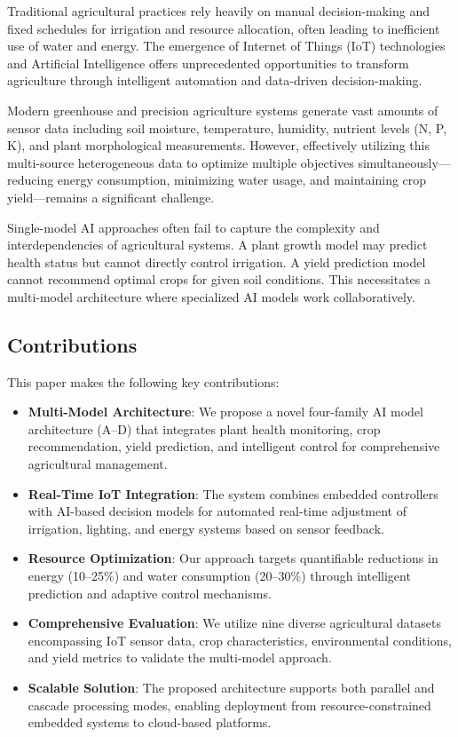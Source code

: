 \documentclass[conference]{IEEEtran}
\begin{document}
Traditional agricultural practices rely heavily on manual decision-making and fixed schedules for irrigation and resource allocation, often leading to inefficient use of water and energy. The emergence of Internet of Things (IoT) technologies and Artificial Intelligence offers unprecedented opportunities to transform agriculture through intelligent automation and data-driven decision-making.

Modern greenhouse and precision agriculture systems generate vast amounts of sensor data including soil moisture, temperature, humidity, nutrient levels (N, P, K), and plant morphological measurements. However, effectively utilizing this multi-source heterogeneous data to optimize multiple objectives simultaneously—reducing energy consumption, minimizing water usage, and maintaining crop yield—remains a significant challenge.

Single-model AI approaches often fail to capture the complexity and interdependencies of agricultural systems. A plant growth model may predict health status but cannot directly control irrigation. A yield prediction model cannot recommend optimal crops for given soil conditions. This necessitates a multi-model architecture where specialized AI models work collaboratively.

\subsection{Contributions}

This paper makes the following key contributions:

\begin{itemize}
\item \textbf{Multi-Model Architecture}: We propose a novel four-family AI model architecture (A--D) that integrates plant health monitoring, crop recommendation, yield prediction, and intelligent control for comprehensive agricultural management.

\item \textbf{Real-Time IoT Integration}: The system combines embedded controllers with AI-based decision models for automated real-time adjustment of irrigation, lighting, and energy systems based on sensor feedback.

\item \textbf{Resource Optimization}: Our approach targets quantifiable reductions in energy (10--25\%) and water consumption (20--30\%) through intelligent prediction and adaptive control mechanisms.

\item \textbf{Comprehensive Evaluation}: We utilize nine diverse agricultural datasets encompassing IoT sensor data, crop characteristics, environmental conditions, and yield metrics to validate the multi-model approach.

\item \textbf{Scalable Solution}: The proposed architecture supports both parallel and cascade processing modes, enabling deployment from resource-constrained embedded systems to cloud-based platforms.
\end{itemize}
\end{document}
